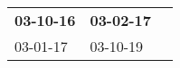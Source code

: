 \begin{supertabular}{p{0.33\columnwidth}p{0.33\columnwidth}p{0.33\columnwidth}}
 \textbf{03-10-16\textsuperscript{}} &  \textbf{03-02-17\textsuperscript{}} \\
          03-01-17\textsuperscript{} &           03-10-19\textsuperscript{} \\
\end{supertabular}
